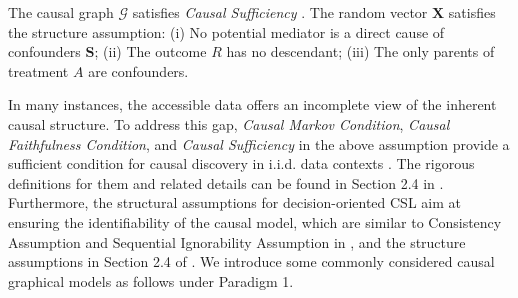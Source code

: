 

\begin{assumption}
    The causal graph $\mathcal{G}$ satisfies \textit{Causal Sufficiency} \citep{hasan2023a}. The random vector $\mathbf{X}$ satisfies the structure assumption: (i) No potential mediator is a direct cause of confounders $\mathbf{S}$; (ii) The outcome $R$ has no descendant; (iii) The only parents of treatment $A$ are confounders.
\end{assumption}

In many instances, the accessible data offers an incomplete view of the inherent causal structure.  To address this gap, \textit{Causal Markov Condition}, \textit{Causal Faithfulness Condition}, and \textit{Causal Sufficiency} in the above assumption provide a sufficient condition for causal discovery in i.i.d. data contexts  \citep{lee2020towards,assaad2022survey,hasan2023a}. The rigorous definitions for them and related details can be found in Section 2.4 in \cite{hasan2023a}. Furthermore, the structural assumptions for decision-oriented \acrshort{CSL} aim at ensuring the identifiability of the causal model, which are similar to Consistency Assumption and Sequential Ignorability Assumption in \cite{tchetgen2012semiparametric}, and the structure assumptions in Section 2.4 of \cite{chakrabortty2018inference}.  We introduce some commonly considered causal graphical models as follows under Paradigm 1.

\smallskip

